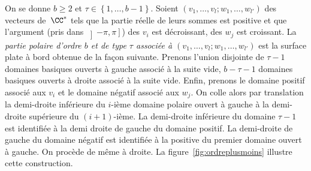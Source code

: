 On se donne $b\geq2$ et $\tau\in\left\{1,\dots,b-1\right\}$.
Soient $(v_{1},\dots,v_{l};w_{1},\dots,w_{l'})$ des vecteurs de~$\CC^{\ast}$ tels que la partie réelle de leurs sommes est positive et que l'argument (pris dans $\left]-\pi,\pi\right]$) des $v_{i}$ est décroissant, des $w_{j}$ est croissant.
La \emph{partie polaire d'ordre $b$ et de type $\tau$ associée à $(v_{1},\dots,v_{l};w_{1},\dots,w_{l'})$} est la surface plate à bord obtenue de la façon suivante. Prenons l'union disjointe de $\tau-1$ domaines basiques ouverts à gauche associé à la suite vide, $b-\tau-1$ domaines basiques ouverts à droite associé à la suite vide. Enfin, prenons le domaine positif associé aux $v_{i}$ et le domaine négatif associé aux $w_{j}$. On colle alors par translation la demi-droite inférieure du $i$-ième domaine polaire ouvert à gauche à la demi-droite supérieure du $(i+1)$-ième. La demi-droite inférieure du domaine $\tau-1$ est identifiée à la demi droite de gauche du domaine positif. La demi-droite de gauche du domaine négatif est identifiée à la positive du premier domaine ouvert à gauche. On procède de même à droite. La figure~\ref{fig:ordreplusmoins} illustre cette construction.

